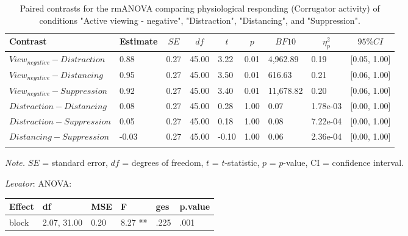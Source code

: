 \documentclass[
  man,floatsintext]{apa6}
\begin{document}
\begin{table}[H]

\begin{center}
\begin{threeparttable}

\caption{\label{tab:unnamed-chunk-8}Paired contrasts for the rmANOVA comparing physiological responding (Corrugator activity) of conditions "Active viewing - negative", "Distraction", "Distancing", and "Suppression".}

\begin{tabular}{lllllllll}
\toprule
Contrast & \multicolumn{1}{c}{Estimate} & \multicolumn{1}{c}{$SE$} & \multicolumn{1}{c}{$df$} & \multicolumn{1}{c}{$t$} & \multicolumn{1}{c}{$p$} & \multicolumn{1}{c}{$BF10$} & \multicolumn{1}{c}{$\eta_{p}^{2}$} & \multicolumn{1}{c}{$95\% CI$}\\
\midrule
$View_{negative} - Distraction$ & 0.88 & 0.27 & 45.00 & 3.22 & 0.01 & 4,962.89 & 0.19 & {}[0.05, 1.00]\\
$View_{negative} - Distancing$ & 0.95 & 0.27 & 45.00 & 3.50 & 0.01 & 616.63 & 0.21 & {}[0.06, 1.00]\\
$View_{negative} - Suppression$ & 0.92 & 0.27 & 45.00 & 3.40 & 0.01 & 11,678.82 & 0.20 & {}[0.06, 1.00]\\
$Distraction - Distancing$ & 0.08 & 0.27 & 45.00 & 0.28 & 1.00 & 0.07 & 1.78e-03 & {}[0.00, 1.00]\\
$Distraction - Suppression$ & 0.05 & 0.27 & 45.00 & 0.18 & 1.00 & 0.08 & 7.22e-04 & {}[0.00, 1.00]\\
$Distancing - Suppression$ & -0.03 & 0.27 & 45.00 & -0.10 & 1.00 & 0.06 & 2.36e-04 & {}[0.00, 1.00]\\
\bottomrule
\addlinespace
\end{tabular}

\begin{tablenotes}[para]
\normalsize{\textit{Note.} $SE$ = standard error, $df$ = degrees of freedom, $t$ = $t$-statistic, $p$ = $p$-value, CI = confidence interval.}
\end{tablenotes}

\end{threeparttable}
\end{center}

\end{table}

\emph{Levator}: ANOVA:

\begin{tabular}{l|l|l|l|l|l}
\hline
Effect & df & MSE & F & ges & p.value\\
\hline
block & 2.07, 31.00 & 0.20 & 8.27 ** & .225 & .001\\
\hline
\end{tabular}
\end{document}
